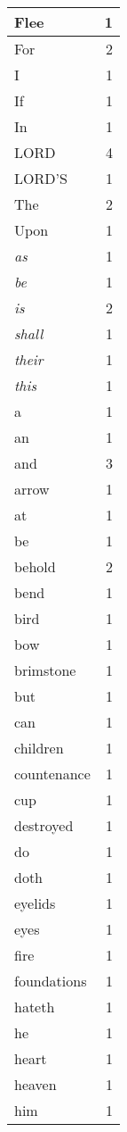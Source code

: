 \begin{center}
\begin{longtable}{l|r}
\hline \hline
\endlastfoot
Flee & 1 \\ \hline
For & 2 \\ \hline
I & 1 \\ \hline
If & 1 \\ \hline
In & 1 \\ \hline
LORD & 4 \\ \hline
LORD'S & 1 \\ \hline
The & 2 \\ \hline
Upon & 1 \\ \hline
\emph{as} & 1 \\ \hline
\emph{be} & 1 \\ \hline
\emph{is} & 2 \\ \hline
\emph{shall} & 1 \\ \hline
\emph{their} & 1 \\ \hline
\emph{this} & 1 \\ \hline
a & 1 \\ \hline
an & 1 \\ \hline
and & 3 \\ \hline
arrow & 1 \\ \hline
at & 1 \\ \hline
be & 1 \\ \hline
behold & 2 \\ \hline
bend & 1 \\ \hline
bird & 1 \\ \hline
bow & 1 \\ \hline
brimstone & 1 \\ \hline
but & 1 \\ \hline
can & 1 \\ \hline
children & 1 \\ \hline
countenance & 1 \\ \hline
cup & 1 \\ \hline
destroyed & 1 \\ \hline
do & 1 \\ \hline
doth & 1 \\ \hline
eyelids & 1 \\ \hline
eyes & 1 \\ \hline
fire & 1 \\ \hline
foundations & 1 \\ \hline
hateth & 1 \\ \hline
he & 1 \\ \hline
heart & 1 \\ \hline
heaven & 1 \\ \hline
him & 1 \\ \hline

\end{longtable}
\end{center}
